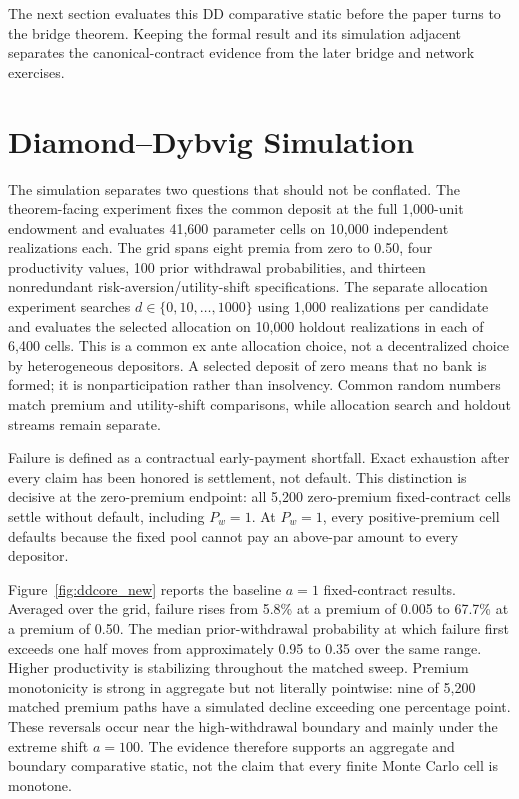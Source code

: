 \documentclass[12pt]{article}\usepackage[]{graphicx}\usepackage[]{xcolor}
\begin{document}
The next section evaluates this DD comparative static before the paper turns to the bridge theorem.
Keeping the formal result and its simulation adjacent separates the canonical-contract evidence from the later bridge and network exercises.

\section{Diamond--Dybvig Simulation}
\label{sec:ddsimulation}

The simulation separates two questions that should not be conflated.
The theorem-facing experiment fixes the common deposit at the full 1{,}000-unit endowment and evaluates 41{,}600 parameter cells on 10{,}000 independent realizations each.
The grid spans eight premia from zero to 0.50, four productivity values, 100 prior withdrawal probabilities, and thirteen nonredundant risk-aversion/utility-shift specifications.
The separate allocation experiment searches $d\in\{0,10,\ldots,1000\}$ using 1{,}000 realizations per candidate and evaluates the selected allocation on 10{,}000 holdout realizations in each of 6{,}400 cells.
This is a common ex ante allocation choice, not a decentralized choice by heterogeneous depositors.
A selected deposit of zero means that no bank is formed; it is nonparticipation rather than insolvency.
Common random numbers match premium and utility-shift comparisons, while allocation search and holdout streams remain separate.

Failure is defined as a contractual early-payment shortfall.
Exact exhaustion after every claim has been honored is settlement, not default.
This distinction is decisive at the zero-premium endpoint: all 5{,}200 zero-premium fixed-contract cells settle without default, including $P_w=1$.
At $P_w=1$, every positive-premium cell defaults because the fixed pool cannot pay an above-par amount to every depositor.

Figure~\ref{fig:ddcore_new} reports the baseline $a=1$ fixed-contract results.
Averaged over the grid, failure rises from 5.8\% at a premium of 0.005 to 67.7\% at a premium of 0.50.
The median prior-withdrawal probability at which failure first exceeds one half moves from approximately 0.95 to 0.35 over the same range.
Higher productivity is stabilizing throughout the matched sweep.
Premium monotonicity is strong in aggregate but not literally pointwise: nine of 5{,}200 matched premium paths have a simulated decline exceeding one percentage point.
These reversals occur near the high-withdrawal boundary and mainly under the extreme shift $a=100$.
The evidence therefore supports an aggregate and boundary comparative static, not the claim that every finite Monte Carlo cell is monotone.
\end{document}
